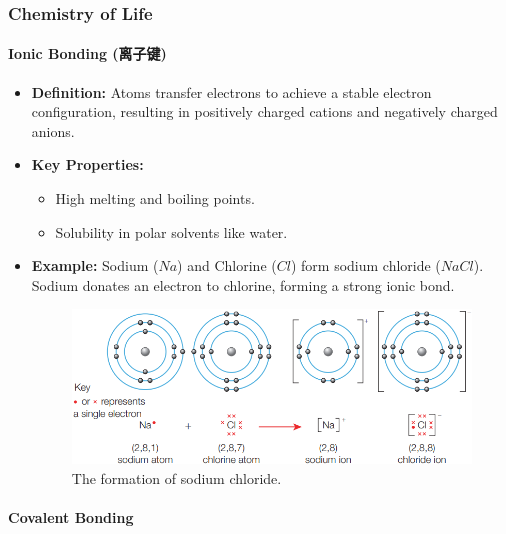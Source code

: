 \subsubsection{Chemistry of Life}
\paragraph{Ionic Bonding (离子键)}
\begin{itemize}
    \item \textbf{Definition:} Atoms transfer electrons to achieve a stable electron configuration,
    resulting in positively charged cations and negatively charged anions.
    \item \textbf{Key Properties:}
    \begin{itemize}
        \item High melting and boiling points.
        \item Solubility in polar solvents like water.
    \end{itemize}
    \item \textbf{Example:} Sodium ($Na$) and Chlorine ($Cl$) form sodium chloride ($NaCl$).
    Sodium donates an electron to chlorine, forming a strong ionic bond.
    \begin{figure}[H]
        \centering
        \includegraphics[scale=0.8]{Biology/1A/Images/1A-1-1.png}
        \caption{The formation of sodium chloride.}
    \end{figure}
\end{itemize}

\paragraph{Covalent Bonding}
